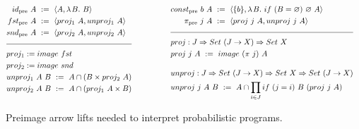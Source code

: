 \documentclass[preprint]{sigplanconf}
\newcommand{\smallmathfont}{\fontsize{7.5}{9}\selectfont}
\newcommand{\pre}{_\mathrm{pre}}
\begin{document}
\begin{figure*}[!tb]\centering
\smallmathfont
\begin{align*}
\begin{aligned}[t]
	&\begin{aligned}[t]
		id\pre~A &\ := \ \pair{A,\fun{B}{B}} \\
		fst\pre~A &\ := \ \pair{proj_1~A,unproj_1~A} \\
		snd\pre~A &\ := \ \pair{proj_2~A,unproj_2~A} \\
	\end{aligned} \\
\\[-8pt]
\hline
\\[-8pt]
	&\begin{aligned}[t]
		&proj_1 := image~fst \\
		&proj_2 := image~snd \\
		&unproj_1~A~B \ := \ A \i (B \times proj_2~A) \\
		&unproj_2~A~B \ := \ A \i (proj_1~A \times B)
	\end{aligned}
\end{aligned}
&\tab\tab\tab\tab\tab
\begin{aligned}[t]
	&\begin{aligned}[t]
		const\pre~b~A &\ := \ \pair{\set{b},\fun{B}{if~(B = \emptyset)~\emptyset~A}} \\
		\pi\pre~j~A &\ := \ \pair{proj~j~A, unproj~j~A}
	\end{aligned} \\
\\[-8pt]
\hline
\\[-8pt]
	&\begin{aligned}[t]
		&proj : J \tto Set~(J \to X) \tto Set~X \\
		&proj~j~A \ := \ image~(\pi~j)~A
	\end{aligned} \\
\\[-6pt]
	&\begin{aligned}[t]
		&unproj : J \tto Set~(J \to X) \tto Set~X \tto Set~(J \to X) \\
		&unproj~j~A~B \ := \ A \i \prod_{i \in J} if~(j = i)~B~(proj~j~A)
	\end{aligned}
\end{aligned}
\end{align*}
\bottomhrule
\caption[ ]{Preimage arrow lifts needed to interpret probabilistic programs.}
\label{fig:extra-preimage-arrow-defs}
\end{figure*}
\end{document}
